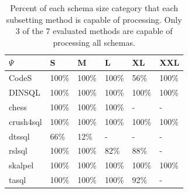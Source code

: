 \begin{table}
\caption{Percent of each schema size category that each subsetting method is capable of processing. Only 3 of the 7 evaluated methods are capable of processing all schemas.}
\label{tab:schema-size-limits}
\begin{tabular}{llllll}
\toprule
$\Psi$ & S & M & L & XL & XXL \\
\midrule
CodeS & 100\% & 100\% & 100\% & 56\% & 100\% \\
DINSQL & 100\% & 100\% & 100\% & 100\% & 100\% \\
chess & 100\% & 100\% & 100\% & - & - \\
crush4sql & 100\% & 100\% & 100\% & 100\% & 100\% \\
dtssql & 66\% & 12\% & - & - & - \\
rslsql & 100\% & 100\% & 82\% & 88\% & - \\
skalpel & 100\% & 100\% & 100\% & 100\% & 100\% \\
tasql & 100\% & 100\% & 100\% & 92\% & - \\
\bottomrule
\end{tabular}
\end{table}
